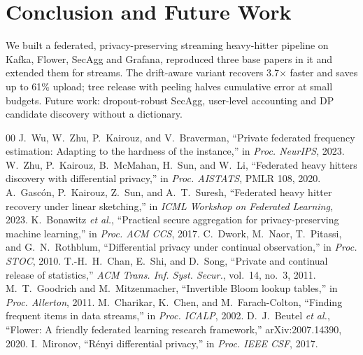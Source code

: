 \documentclass[conference]{IEEEtran}
\begin{document}
\section{Conclusion and Future Work}
We built a federated, privacy-preserving streaming heavy-hitter pipeline on Kafka, Flower, SecAgg and Grafana, reproduced
three base papers in it and extended them for streams. The drift-aware variant recovers 3.7$\times$ faster and saves up to
61\% upload; tree release with peeling halves cumulative error at small budgets. Future work: dropout-robust SecAgg,
user-level accounting and DP candidate discovery without a dictionary.

\begin{thebibliography}{00}
 J.~Wu, W.~Zhu, P.~Kairouz, and V.~Braverman, ``Private federated frequency estimation: Adapting to the hardness of the instance,'' in \emph{Proc. NeurIPS}, 2023.
 W.~Zhu, P.~Kairouz, B.~McMahan, H.~Sun, and W.~Li, ``Federated heavy hitters discovery with differential privacy,'' in \emph{Proc. AISTATS}, PMLR 108, 2020.
 A.~Gasc\'on, P.~Kairouz, Z.~Sun, and A.~T.~Suresh, ``Federated heavy hitter recovery under linear sketching,'' in \emph{ICML Workshop on Federated Learning}, 2023.
 K.~Bonawitz \emph{et al.}, ``Practical secure aggregation for privacy-preserving machine learning,'' in \emph{Proc. ACM CCS}, 2017.
 C.~Dwork, M.~Naor, T.~Pitassi, and G.~N.~Rothblum, ``Differential privacy under continual observation,'' in \emph{Proc. STOC}, 2010.
 T.-H.~H.~Chan, E.~Shi, and D.~Song, ``Private and continual release of statistics,'' \emph{ACM Trans. Inf. Syst. Secur.}, vol.~14, no.~3, 2011.
 M.~T.~Goodrich and M.~Mitzenmacher, ``Invertible Bloom lookup tables,'' in \emph{Proc. Allerton}, 2011.
 M.~Charikar, K.~Chen, and M.~Farach-Colton, ``Finding frequent items in data streams,'' in \emph{Proc. ICALP}, 2002.
 D.~J.~Beutel \emph{et al.}, ``Flower: A friendly federated learning research framework,'' arXiv:2007.14390, 2020.
 I.~Mironov, ``R\'enyi differential privacy,'' in \emph{Proc. IEEE CSF}, 2017.
\end{thebibliography}
\end{document}
